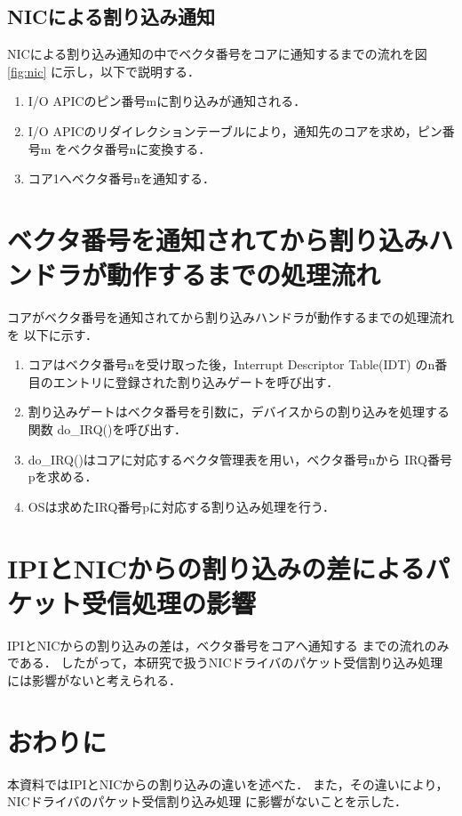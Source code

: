 \documentclass[12pt]{jsarticle}
\begin{document}
        \subsection{NICによる割り込み通知}\label{nic}

        NICによる割り込み通知の中でベクタ番号をコアに通知するまでの流れを図\ref{fig:nic}
        に示し，以下で説明する．
        \begin{enumerate}
            \item I/O APICのピン番号mに割り込みが通知される．
            \item I/O APICのリダイレクションテーブルにより，通知先のコアを求め，ピン番号m
                をベクタ番号nに変換する．
            \item コア1へベクタ番号nを通知する．
        \end{enumerate}
\section{ベクタ番号を通知されてから割り込みハンドラが動作するまでの処理流れ}
コアがベクタ番号を通知されてから割り込みハンドラが動作するまでの処理流れを
以下に示す．

\begin{enumerate}
    \item
        コアはベクタ番号nを受け取った後，Interrupt Descriptor Table(IDT) 
        のn番目のエントリに登録された割り込みゲートを呼び出す．
    \item 
        割り込みゲートはベクタ番号を引数に，デバイスからの割り込みを処理する
        関数 do\_IRQ()を呼び出す．
    \item 
        do\_IRQ()はコアに対応するベクタ管理表を用い，ベクタ番号nから
        IRQ番号pを求める．
    \item
        OSは求めたIRQ番号pに対応する割り込み処理を行う．
\end{enumerate}

\section{IPIとNICからの割り込みの差によるパケット受信処理の影響}
IPIとNICからの割り込みの差は，ベクタ番号をコアへ通知する
までの流れのみである．
したがって，本研究で扱うNICドライバのパケット受信割り込み処理
には影響がないと考えられる．
\section{おわりに}
本資料ではIPIとNICからの割り込みの違いを述べた．
また，その違いにより，NICドライバのパケット受信割り込み処理
に影響がないことを示した．
\end{document}
